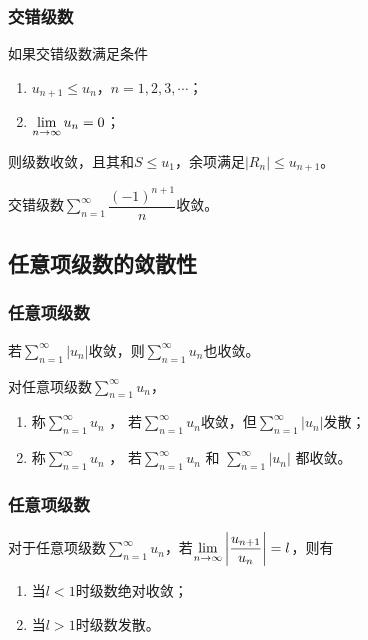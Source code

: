 \documentclass[14pt,notheorems,leqno,xcolor={rgb}]{beamer} %
\begin{document}
\begin{frame}
\frametitle{交错级数}
\begin{theorem}[莱布尼兹定理]
如果交错级数满足条件
\begin{enumerate}
  \item $u_{n+1}\le u_n$，$n=1,2,3,\cdots$；
  \item $\lim\limits_{n\to\infty}u_n=0$；
\end{enumerate}
则级数收敛，且其和$S\le u_1$，余项满足$|R_n|\le u_{n+1}$。
\end{theorem}
\vpause
\begin{example}
交错级数$\sum\limits_{n=1}^{\infty}\dfrac{(-1)^{n+1}}n$收敛。
\end{example}
\end{frame}

\subsection{任意项级数的敛散性}

\begin{frame}
\frametitle{任意项级数}
\begin{theorem}
若$\sum\limits_{n=1}^{\infty}|u_n|$收敛，则$\sum\limits_{n=1}^{\infty}u_n$也收敛。
\end{theorem}
\pause
\begin{definition}
对任意项级数$\sum\limits_{n=1}^{\infty}u_n$，\pause
\begin{enumerate}[<+->]
  \item 称$\sum\limits_{n=1}^{\infty}u_n$ ，
        若$\sum\limits_{n=1}^{\infty}u_n$收敛，但$\sum\limits_{n=1}^{\infty}|u_n|$发散；
  \item 称$\sum\limits_{n=1}^{\infty}u_n$ ，
        若$\sum\limits_{n=1}^{\infty}u_n$ 和 $\sum\limits_{n=1}^{\infty}|u_n|$ 都收敛。
\end{enumerate}
\end{definition}
\end{frame}

\begin{frame}
\frametitle{任意项级数}
\begin{theorem}
对于任意项级数$\sum\limits_{n=1}^{\infty}u_n$，若$\lim\limits_{n\to\infty}\left|\dfrac{u_{n+1}}{u_n}\right|=l$，则有
\begin{enumerate}
  \item 当$l<1$时级数绝对收敛；
  \item 当$l>1$时级数发散。
\end{enumerate}
\end{theorem}
\end{frame}
\end{document}
